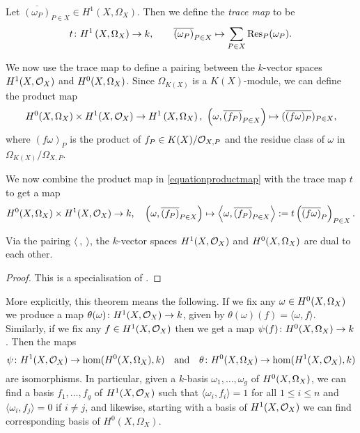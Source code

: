     \begin{defn}
    Let $\overline{(\omega_P)}_{P \in X} \in H^1(X,\Omega_X)$.
    Then we define the \emph{trace map} to be 
        \[
    t \colon H^1\left(X, \Omega_X\right) \rightarrow k, \qquad \overline{(\omega_P)}_{P \in X}  \mapsto \sum_{P \in X} \operatorname{Res}_P(\omega_P).
        \]
    \end{defn}

We now use the trace map to define a pairing between the $k$-vector spaces $H^1(X,\mathcal{O}_X)$ and ${H^0(X,\Omega_X)}$.
Since $\Omega_{K(X)}$ is a $K(X)$-module, we can define the product map 
    \begin{equation}\label{equationproductmap}
    {H^0(X,\Omega_X)} \times H^1(X,\mathcal{O}_X) \rightarrow H^1\left(X, \Omega_X\right), \ \left(\omega, \overline{(f_P)}_{P \in X}\right) \mapsto ( \overline {(f  \omega)_P})_{P \in X},
    \end{equation}
where $(f\omega)_P$ is the product of $f_P \in K(X)/{\cal O}_{X,P}$ and the residue class of $\omega$ in $\Omega_{K(X)}/\Omega_{X,P}$.

We now combine the product map in \eqref{equationproductmap} with the trace map $t$ to get a map 
    \[
    {H^0(X,\Omega_X)} \times H^1(X,\mathcal{O}_X) \rightarrow k,\quad \left(\omega, \overline{(f_P)}_{P \in X}\right) \mapsto \left\langle \omega, \overline{(f_P)}_{P \in X} \right\rangle := t \left( \overline{(f \omega)}_P \right)_{P \in X}.
    \]

    \begin{thm}\label{theoremserreduality}
    Via the pairing $\langle\ ,\ \rangle$, the $k$-vector spaces $H^1(X,\mathcal{O}_X)$ and ${H^0(X,\Omega_X)}$ are dual to each other.
    \end{thm}
    \begin{proof}
    This is a specialisation of \cite[Chap.\ II, Thm.\ 2]{algebraicgroupsandclassfields}.
    \end{proof}

More explicitly, this theorem means the following.
If we fix any $\omega \in {H^0(X,\Omega_X)}$ we produce a map $\theta(\omega)\colon H^1(X,\mathcal{O}_X) \rightarrow k$, given by $\theta(\omega)(f) = \langle \omega , f\rangle$.
Similarly, if we fix any $f \in H^1(X,\mathcal{O}_X)$ then we get a map $\psi(f) \colon {H^0(X,\Omega_X)} \rightarrow k$.
Then the maps 
    \[
    \psi \colon H^1(X,\mathcal{O}_X) \rightarrow \hom(H^0(X,\Omega_X),k) \quad
    \text{and} \quad    
    \theta \colon H^0(X,\Omega_X) \rightarrow \hom(H^1(X,\mathcal{O}_X), k)
    \]
are isomorphisms.
In particular, given a $k$-basis $\omega_1, \ldots, \omega_g$ of ${H^0(X,\Omega_X)}$, we can find a basis $f_1, \ldots , f_g$ of $H^1(X,\mathcal{O}_X)$ such that $\langle \omega_i, f_i \rangle = 1$ for all $1 \leq i \leq n$ and $\langle \omega_i, f_j \rangle = 0$ if $i \neq j$, and likewise, starting with a basis of $H^1(X,\mathcal{O}_X)$ we can find corresponding basis of $H^0(X,\Omega_X)$. 





















